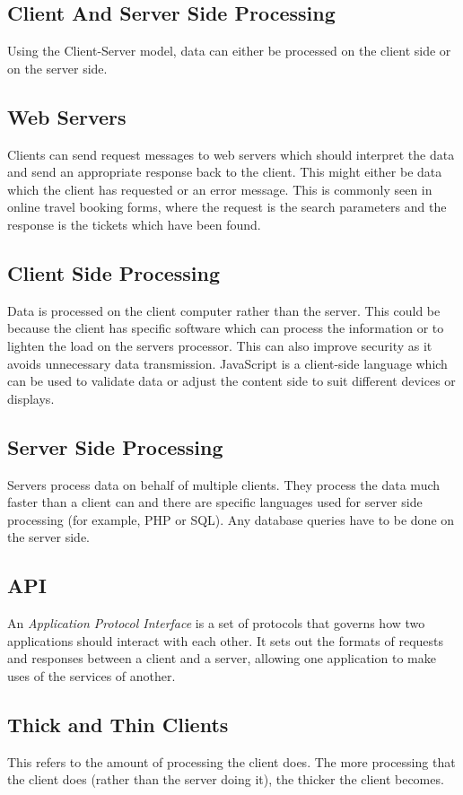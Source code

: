\documentclass[a4paper,11pt]{article}
\begin{document}
\begin{multicols}{2}
\section{Client And Server Side Processing}
Using the Client-Server model, data can either be processed on the client side or on the server side. 
\subsection{Web Servers}
Clients can send request messages to web servers which should interpret the data and send an appropriate response back to the client. This might either be data which the client has requested or an error message. This is commonly seen in online travel booking forms, where the request is the search parameters and the response is the tickets which have been found.
\subsection{Client Side Processing}
Data is processed on the client computer rather than the server. This could be because the client has specific software which can process the information or to lighten the load on the servers processor. This can also improve security as it avoids unnecessary data transmission. JavaScript is a client-side language which can be used to validate data or adjust the content side to suit different devices or displays.
\subsection{Server Side Processing}
Servers process data on behalf of multiple clients. They process the data much faster than a client can and there are specific languages used for server side processing (for example, PHP or SQL). Any database queries have to be done on the server side.
\subsection{API}
An \textit{Application Protocol Interface} is a set of protocols that governs how two applications should interact with each other. It sets out the formats of requests and responses between a client and a server, allowing one application to make uses of the services of another. 
\subsection{Thick and Thin Clients}
This refers to the amount of processing the client does. The more processing that the client does (rather than the server doing it), the thicker the client becomes. 

\end{multicols}
\end{document}
